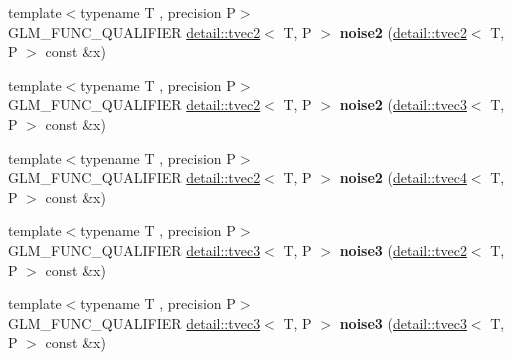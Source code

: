 \begin{DoxyCompactItemize}
\item 
{\footnotesize template$<$typename T , precision P$>$ }\\G\+L\+M\+\_\+\+F\+U\+N\+C\+\_\+\+Q\+U\+A\+L\+I\+F\+I\+ER \hyperlink{structglm_1_1detail_1_1tvec2}{detail\+::tvec2}$<$ T, P $>$ {\bfseries noise2} (\hyperlink{structglm_1_1detail_1_1tvec2}{detail\+::tvec2}$<$ T, P $>$ const \&x)\hypertarget{namespaceglm_aa3cab4c28d156aff0cc38c6870d0b8f8}{}\label{namespaceglm_aa3cab4c28d156aff0cc38c6870d0b8f8}

\item 
{\footnotesize template$<$typename T , precision P$>$ }\\G\+L\+M\+\_\+\+F\+U\+N\+C\+\_\+\+Q\+U\+A\+L\+I\+F\+I\+ER \hyperlink{structglm_1_1detail_1_1tvec2}{detail\+::tvec2}$<$ T, P $>$ {\bfseries noise2} (\hyperlink{structglm_1_1detail_1_1tvec3}{detail\+::tvec3}$<$ T, P $>$ const \&x)\hypertarget{namespaceglm_a745a9e2a6d7e0cd2c357b38a1677b273}{}\label{namespaceglm_a745a9e2a6d7e0cd2c357b38a1677b273}

\item 
{\footnotesize template$<$typename T , precision P$>$ }\\G\+L\+M\+\_\+\+F\+U\+N\+C\+\_\+\+Q\+U\+A\+L\+I\+F\+I\+ER \hyperlink{structglm_1_1detail_1_1tvec2}{detail\+::tvec2}$<$ T, P $>$ {\bfseries noise2} (\hyperlink{structglm_1_1detail_1_1tvec4}{detail\+::tvec4}$<$ T, P $>$ const \&x)\hypertarget{namespaceglm_adb040cdde4e6d6b1fe8715368689bb92}{}\label{namespaceglm_adb040cdde4e6d6b1fe8715368689bb92}

\item 
{\footnotesize template$<$typename T , precision P$>$ }\\G\+L\+M\+\_\+\+F\+U\+N\+C\+\_\+\+Q\+U\+A\+L\+I\+F\+I\+ER \hyperlink{structglm_1_1detail_1_1tvec3}{detail\+::tvec3}$<$ T, P $>$ {\bfseries noise3} (\hyperlink{structglm_1_1detail_1_1tvec2}{detail\+::tvec2}$<$ T, P $>$ const \&x)\hypertarget{namespaceglm_ac547b12bbecbb0750aaa57e1aadf5292}{}\label{namespaceglm_ac547b12bbecbb0750aaa57e1aadf5292}

\item 
{\footnotesize template$<$typename T , precision P$>$ }\\G\+L\+M\+\_\+\+F\+U\+N\+C\+\_\+\+Q\+U\+A\+L\+I\+F\+I\+ER \hyperlink{structglm_1_1detail_1_1tvec3}{detail\+::tvec3}$<$ T, P $>$ {\bfseries noise3} (\hyperlink{structglm_1_1detail_1_1tvec3}{detail\+::tvec3}$<$ T, P $>$ const \&x)\hypertarget{namespaceglm_a786c7437a3a5ce6841dceb147b30af81}{}\label{namespaceglm_a786c7437a3a5ce6841dceb147b30af81}


\end{DoxyCompactItemize}
